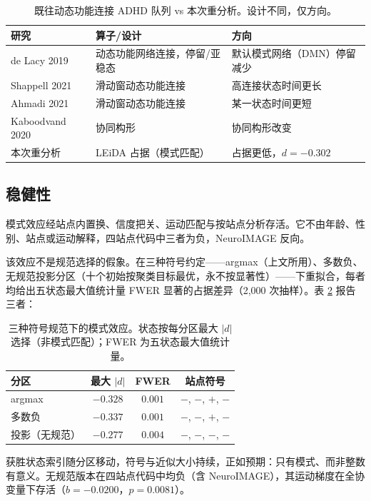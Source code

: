 \documentclass[11pt]{ctexart}
\theoremstyle{definition}
\begin{document}
\begin{table}[H]
\centering
\caption{既往动态功能连接 ADHD 队列 vs 本次重分析。设计不同，仅方向。}
\begin{tabular}{lll}
\toprule
研究 & 算子/设计 & 方向 \\
\midrule
de Lacy 2019 & 动态功能网络连接，停留/亚稳态 & 默认模式网络（DMN）停留减少 \\
Shappell 2021 & 滑动窗动态功能连接 & 高连接状态时间更长 \\
Ahmadi 2021 & 滑动窗动态功能连接 & 某一状态时间更短 \\
Kaboodvand 2020 & 协同构形 & 协同构形改变 \\
本次重分析 & LEiDA 占据（模式匹配） & 占据更低，$d=-0.302$ \\
\bottomrule
\end{tabular}
\label{tab:prior}
\end{table}

\subsection{稳健性}
模式效应经站点内置换、信度把关、运动匹配与按站点分析存活。它不由年龄、性别、站点或运动解释，四站点代码中三者为负，NeuroIMAGE 反向。

该效应不是规范选择的假象。在三种符号约定——argmax（上文所用）、多数负、无规范投影分区（十个初始按聚类目标最优，永不按显著性）——下重拟合，每者均给出五状态最大值统计量 FWER 显著的占据差异（2,000 次抽样）。表 \ref{tab:gauge} 报告三者：

\begin{table}[H]
\centering
\caption{三种符号规范下的模式效应。状态按每分区最大 $|d|$ 选择（非模式匹配）；FWER 为五状态最大值统计量。}
\begin{tabular}{lccc}
\toprule
分区 & 最大 $|d|$ & FWER & 站点符号 \\
\midrule
argmax & $-0.328$ & $0.001$ & $-$, $-$, $+$, $-$ \\
多数负 & $-0.337$ & $0.001$ & $-$, $-$, $+$, $-$ \\
投影（无规范） & $-0.277$ & $0.004$ & $-$, $-$, $-$, $-$ \\
\bottomrule
\end{tabular}
\label{tab:gauge}
\end{table}

\noindent 获胜状态索引随分区移动，符号与近似大小持续，正如预期：只有模式、而非整数有意义。无规范版本在四站点代码中均负（含 NeuroIMAGE），其运动梯度在全协变量下存活（$b=-0.0200$，$p=0.0081$）。
\end{document}
